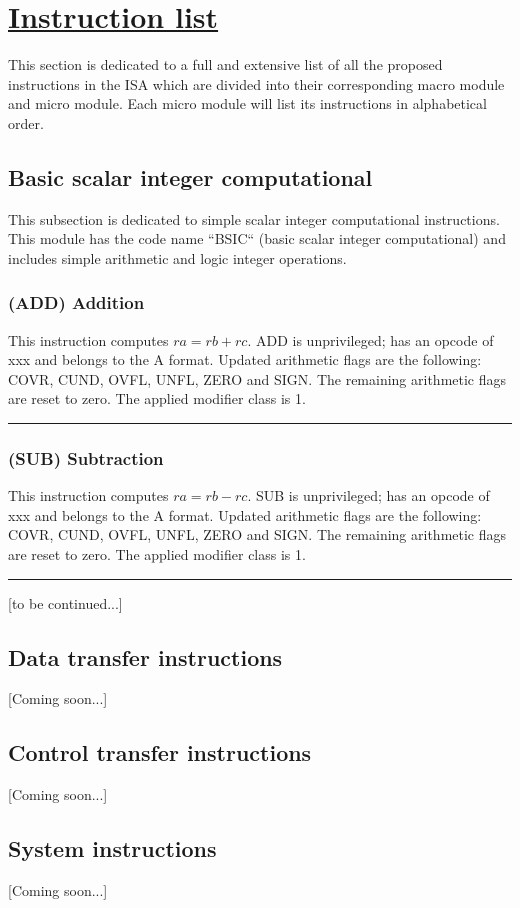 \section[Instruction list]{\LARGE\underline{Instruction list}}

    \vspace{10pt}

    This section is dedicated to a full and extensive list of all the proposed instructions in the ISA which are divided into their corresponding macro module and micro module. Each micro module will list its instructions in alphabetical order.

    \subsection{Basic scalar integer computational}

        \vspace{10pt}

        This subsection is dedicated to simple scalar integer computational instructions. This module has the code name ``BSIC`` (basic scalar integer computational) and includes simple arithmetic and logic integer operations.

        \subsubsection{(ADD) Addition}

            This instruction computes \(ra = rb + rc\). ADD is unprivileged; has an opcode of xxx and belongs to the A format. Updated arithmetic flags are the following: COVR, CUND, OVFL, UNFL, ZERO and SIGN. The remaining arithmetic flags are reset to zero. The applied modifier class is 1.

        \par\noindent\rule{\textwidth}{0.4pt}

        \subsubsection{(SUB) Subtraction}

            This instruction computes \(ra = rb - rc\). SUB is unprivileged; has an opcode of xxx and belongs to the A format. Updated arithmetic flags are the following: COVR, CUND, OVFL, UNFL, ZERO and SIGN. The remaining arithmetic flags are reset to zero. The applied modifier class is 1.

        \par\noindent\rule{\textwidth}{0.4pt}

        [to be continued...]

    \subsection{Data transfer instructions}

        [Coming soon...]

    \subsection{Control transfer instructions}

        [Coming soon...]

    \subsection{System instructions}

        [Coming soon...]